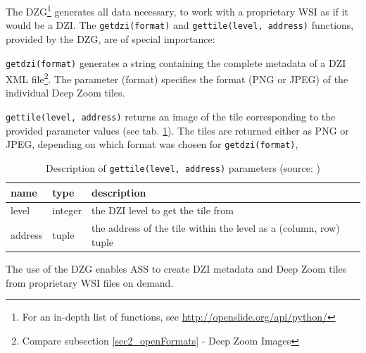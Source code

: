 The DZG\footnote{
	For an in-depth list of functions, see \url{http://openslide.org/api/python/}
} generates all data necessary, to work with a proprietary WSI as if it would be a DZI\cite{web:openslide}. The \texttt{get{\textunderscore}dzi(format)} and \texttt{get{\textunderscore}tile(level, address)} functions, provided by the DZG, are of special importance:

\texttt{get{\textunderscore}dzi(format)} generates a string containing the complete metadata of a DZI XML file\footnote{
	Compare subsection \ref{sec2_openFormats} - Deep Zoom Images
}. The parameter (format) specifies the format (PNG or JPEG) of the individual Deep Zoom tiles.

\texttt{get{\textunderscore}tile(level, address)} returns an image of the tile corresponding to the provided parameter values (see tab. \ref{tab4_getTileParams}). The tiles are returned either as PNG or JPEG, depending on which format was chosen for \texttt{get{\textunderscore}dzi(format)}, 

\begin{table}[H]
	\begin{center}
		\begin{tabular}{| p{1.5cm} | p{1.5cm} | p{7cm} |}
			\hline
			\textbf{name} & \textbf{type} & \textbf{description}\\ \hline
			level & integer & the DZI level to get the tile from \\ \hline
			address & tuple & the address of the tile within the level as a (column, row) tuple\\ \hline
		\end{tabular}
		\caption{Description of \texttt{get{\textunderscore}tile(level, address)} parameters (source: \cite{web:openslide})}
		\label{tab4_getTileParams}
	\end{center}
\end{table}

The use of the DZG enables ASS to create DZI metadata and Deep Zoom tiles from proprietary WSI files on demand.


